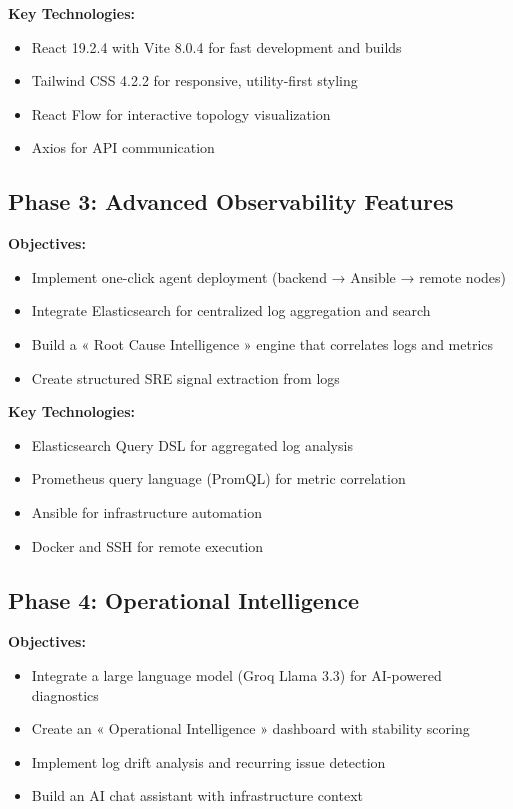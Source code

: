 \documentclass[12pt,a4paper]{report}
\begin{document}
\textbf{Key Technologies:}
\begin{itemize}
  \item React 19.2.4 with Vite 8.0.4 for fast development and builds
  \item Tailwind CSS 4.2.2 for responsive, utility-first styling
  \item React Flow for interactive topology visualization
  \item Axios for API communication
\end{itemize}

\subsection{Phase 3: Advanced Observability Features}

\textbf{Objectives:}
\begin{itemize}
  \item Implement one-click agent deployment (backend → Ansible → remote nodes)
  \item Integrate Elasticsearch for centralized log aggregation and search
  \item Build a « Root Cause Intelligence » engine that correlates logs and metrics
  \item Create structured SRE signal extraction from logs
\end{itemize}

\textbf{Key Technologies:}
\begin{itemize}
  \item Elasticsearch Query DSL for aggregated log analysis
  \item Prometheus query language (PromQL) for metric correlation
  \item Ansible for infrastructure automation
  \item Docker and SSH for remote execution
\end{itemize}

\subsection{Phase 4: Operational Intelligence}

\textbf{Objectives:}
\begin{itemize}
  \item Integrate a large language model (Groq Llama 3.3) for AI-powered diagnostics
  \item Create an « Operational Intelligence » dashboard with stability scoring
  \item Implement log drift analysis and recurring issue detection
  \item Build an AI chat assistant with infrastructure context
\end{itemize}
\end{document}
